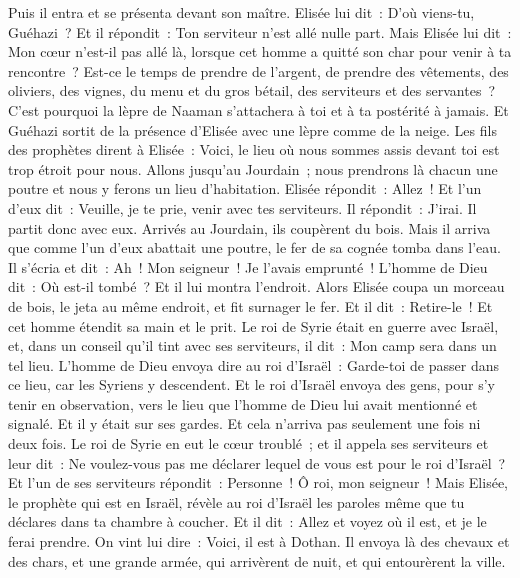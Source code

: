 \begin{multicols}{2}
Puis il entra et se présenta devant son maître. Elisée lui dit~: D'où viens-tu, Guéhazi~? Et il répondit~: Ton serviteur n'est allé nulle part.
Mais Elisée lui dit~: Mon cœur n'est-il pas allé là, lorsque cet homme a quitté son char pour venir à ta rencontre~? Est-ce le temps de prendre de l'argent, de prendre des vêtements, des oliviers, des vignes, du menu et du gros bétail, des serviteurs et des servantes~?
C'est pourquoi la lèpre de Naaman s'attachera à toi et à ta postérité à jamais. Et Guéhazi sortit de la présence d'Elisée avec une lèpre comme de la neige.
\VerseOne{}Les fils des prophètes dirent à Elisée~: Voici, le lieu où nous sommes assis devant toi est trop étroit pour nous.
Allons jusqu'au Jourdain~; nous prendrons là chacun une poutre et nous y ferons un lieu d'habitation. Elisée répondit~: Allez~!
Et l'un d'eux dit~: Veuille, je te prie, venir avec tes serviteurs. Il répondit~: J'irai.
Il partit donc avec eux. Arrivés au Jourdain, ils coupèrent du bois.
Mais il arriva que comme l'un d'eux abattait une poutre, le fer de sa cognée tomba dans l'eau. Il s'écria et dit~: Ah~! Mon seigneur~! Je l'avais emprunté~!
L'homme de Dieu dit~: Où est-il tombé~? Et il lui montra l'endroit. Alors Elisée coupa un morceau de bois, le jeta au même endroit, et fit surnager le fer.
Et il dit~: Retire-le~! Et cet homme étendit sa main et le prit.
Le roi de Syrie était en guerre avec Israël, et, dans un conseil qu'il tint avec ses serviteurs, il dit~: Mon camp sera dans un tel lieu.
L'homme de Dieu envoya dire au roi d'Israël~: Garde-toi de passer dans ce lieu, car les Syriens y descendent.
Et le roi d'Israël envoya des gens, pour s'y tenir en observation, vers le lieu que l'homme de Dieu lui avait mentionné et signalé. Et il y était sur ses gardes. Et cela n'arriva pas seulement une fois ni deux fois.
Le roi de Syrie en eut le cœur troublé~; et il appela ses serviteurs et leur dit~: Ne voulez-vous pas me déclarer lequel de vous est pour le roi d'Israël~?
Et l'un de ses serviteurs répondit~: Personne~! Ô roi, mon seigneur~! Mais Elisée, le prophète qui est en Israël, révèle au roi d'Israël les paroles même que tu déclares dans ta chambre à coucher.
Et il dit~: Allez et voyez où il est, et je le ferai prendre. On vint lui dire~: Voici, il est à Dothan.
Il envoya là des chevaux et des chars, et une grande armée, qui arrivèrent de nuit, et qui entourèrent la ville.

\end{multicols}
